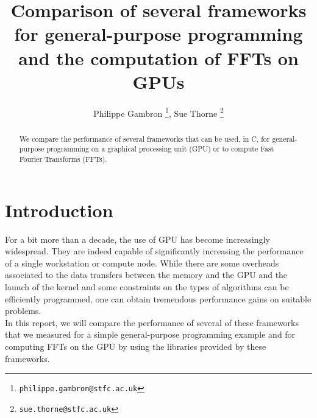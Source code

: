 \documentclass[12pt, a4paper]{article}
\date{}
\begin{document}
\title{Comparison of several frameworks for general-purpose programming and the  computation of FFTs on GPUs}
\author{Philippe Gambron \thanks{\texttt{philippe.gambron{@}stfc.ac.uk}}, Sue Thorne \thanks{\texttt{sue.thorne{@}stfc.ac.uk}}}
\maketitle
\begin{abstract}
We compare the performance of several frameworks that can be used, in C, for general-purpose programming on a graphical processing unit (GPU) or to compute Fast Fourier Transforms (FFTs).  
\end{abstract}
\section{Introduction}
For a bit more than a decade, the use of GPU has become increasingly widespread. They are indeed capable of significantly increasing the performance of a single workstation or compute node. While there are some overheads associated to the data transfers between the memory and the GPU and the launch of the kernel and some constraints on the types of algorithms can be efficiently programmed, one can obtain tremendous performance gains on suitable problems.\\

In this report, we will compare the performance of several of these frameworks that we measured for a simple general-purpose programming example and for computing FFTs on the GPU by using the libraries provided by these frameworks. 
\end{document}
